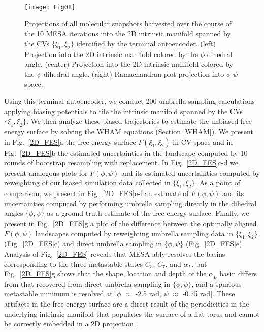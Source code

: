 \documentclass[12pt]{article}
\newcommand*{\blauw}[1]{#1}
\begin{document}
\begin{figure}[ht!]
\begin{center}
\texttt{[image: Fig08]} 
\caption{Projections of all molecular snapshots harvested over the course of the 10 MESA iterations into the 2D intrinsic manifold spanned by the CVs $\{\xi_1,\xi_2\}$ identified by the terminal autoencoder. (left) Projection into the 2D intrinsic manifold colored by the $\phi$ dihedral angle. (center) Projection into the 2D intrinsic manifold colored by the $\psi$ dihedral angle. (right) Ramachandran plot projection into $\phi$-$\psi$ space.}
\label{2D_autoencoder_plot_used_in_WHAM}
\end{center}
\end{figure}

Using this terminal autoencoder, we conduct 200 umbrella sampling calculations applying biasing potentials to tile the intrinsic manifold spanned by the CVs $\{\xi_1,\xi_2\}$. We then analyze these biased trajectories to estimate the unbiased free energy surface by solving the WHAM equations (\blauw{Section \ref{WHAM}}). We present in \blauw{Fig.~\ref{2D_FES}a} the free energy surface $F(\xi_1,\xi_2)$ in CV space and in \blauw{Fig.~\ref{2D_FES}b} the estimated uncertainties in the landscape computed by 10 rounds of bootstrap resampling with replacement. In \blauw{Fig.~\ref{2D_FES}c-d} we present analogous plots for $F(\phi,\psi)$ and its estimated uncertainties computed by reweighting of our biased simulation data collected in $\{\xi_1,\xi_2\}$. As a point of comparison, we present in \blauw{Fig.~\ref{2D_FES}e-f} an estimate of $F(\phi,\psi)$ and its uncertainties computed by performing umbrella sampling directly in the dihedral angles $\{\phi,\psi\}$ as a ground truth estimate of the free energy surface. Finally, we present in \blauw{Fig.~\ref{2D_FES}g} a plot of the difference between the optimally aligned $F(\phi,\psi)$ landscapes computed by reweighting umbrella sampling data in $\{\xi_1,\xi_2\}$ (\blauw{Fig.~\ref{2D_FES}c}) and direct umbrella sampling in $\{\phi,\psi\}$ (\blauw{Fig.~\ref{2D_FES}e}). Analysis of \blauw{Fig.~\ref{2D_FES}} reveals that MESA ably resolves the basins corresponding to the three metastable states $C_5$, $C_7$, and $\alpha_L$, but \blauw{Fig.~\ref{2D_FES}g} shows that the shape, location and depth of the $\alpha_L$ basin differs from that recovered from direct umbrella sampling in $\{\phi,\psi\}$, and a spurious metastable minimum is resolved at [$\phi$ $\approx$ -2.5 rad, $\psi$ $\approx$ -0.75 rad].  These artifacts in the free energy surface are a direct result of the periodicities in the underlying intrinsic manifold that populates the surface of a flat torus and cannot be correctly embedded in a 2D projection \cite{hashemian2015topological}.
\end{document}
